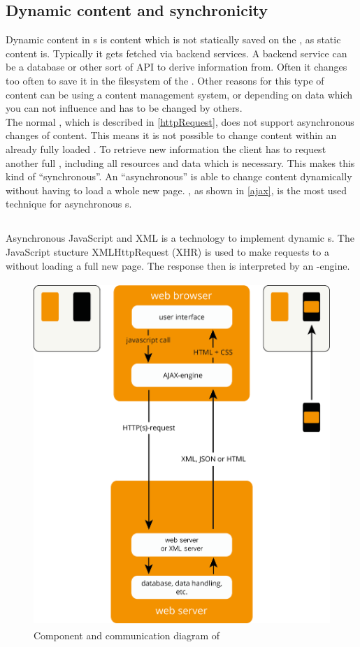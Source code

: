 \subsection{Dynamic content and synchronicity\label{synchronicity}}
Dynamic content in \webSite{}s is content which is not statically saved on the \webServer{}, as static content is.
Typically it gets fetched via backend services.
A backend service can be a database or other sort of API to derive information from.
Often it changes too often to save it in the filesystem of the \webServer{}.
Other reasons for this type of content can be using a content management system, or depending on data which you can not influence and has to be changed by others.
\\
The normal \httpRequest{}, which is described in \ref{httpRequest}, does not support asynchronous changes of content.
This means it is not possible to change content within an already fully loaded \webPage{}.
To retrieve new information the client has to request another full \webPage{}, including all resources and data which is necessary.
This makes this kind of \webSite{} \enquote{synchronous}.
An \enquote{asynchronous} \webSite{} is able to change content dynamically without having to load a whole new page.
\ajax{}, as shown in \ref{ajax}, is the most used technique for asynchronous \webSite{}s.

\subsection{\ajax{}\label{ajax}}
Asynchronous JavaScript and XML is a technology to implement dynamic \webPage{}s.
The JavaScript stucture XMLHttpRequest (XHR) is used to make requests to a \webServer{} without loading a full new page.
The response then is interpreted by an \ajax{}-engine.
\begin{figure}[H]
\centering
\includegraphics[height=13cm]{images/ajax.png}
\caption[ajax_components]{Component and communication diagram of \ajax{}}
\label{fig:ajax_components}
\end{figure}

